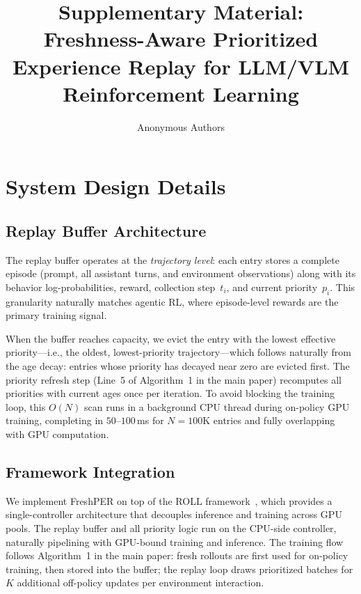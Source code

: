 \documentclass[runningheads]{llncs}
\newcommand{\method}{FreshPER}
\begin{document}
\title{Supplementary Material: Freshness-Aware Prioritized Experience Replay for LLM/VLM Reinforcement Learning}


\author{Anonymous Authors}

\maketitle

\setcounter{section}{0}
\renewcommand{\thesection}{\Alph{section}}

\section{System Design Details}
\label{app:system}

\subsection{Replay Buffer Architecture}
\label{app:buffer_arch}

The replay buffer operates at the \emph{trajectory level}: each entry stores a complete episode (prompt, all assistant turns, and environment observations) along with its behavior log-probabilities, reward, collection step~$t_i$, and current priority~$p_i$. This granularity naturally matches agentic RL, where episode-level rewards are the primary training signal.

When the buffer reaches capacity, we evict the entry with the lowest effective priority---i.e., the oldest, lowest-priority trajectory---which follows naturally from the age decay: entries whose priority has decayed near zero are evicted first. The priority refresh step (Line~5 of Algorithm~1 in the main paper) recomputes all priorities with current ages once per iteration. To avoid blocking the training loop, this $O(N)$ scan runs in a background CPU thread during on-policy GPU training, completing in $50$--$100$\,ms for $N{=}100$K entries and fully overlapping with GPU computation.

\subsection{Framework Integration}
\label{app:pipeline}

We implement \method{} on top of the ROLL framework~\cite{wang2025roll}, which provides a single-controller architecture that decouples inference and training across GPU pools. The replay buffer and all priority logic run on the CPU-side controller, naturally pipelining with GPU-bound training and inference. The training flow follows Algorithm~1 in the main paper: fresh rollouts are first used for on-policy training, then stored into the buffer; the replay loop draws prioritized batches for $K$ additional off-policy updates per environment interaction.
\end{document}

